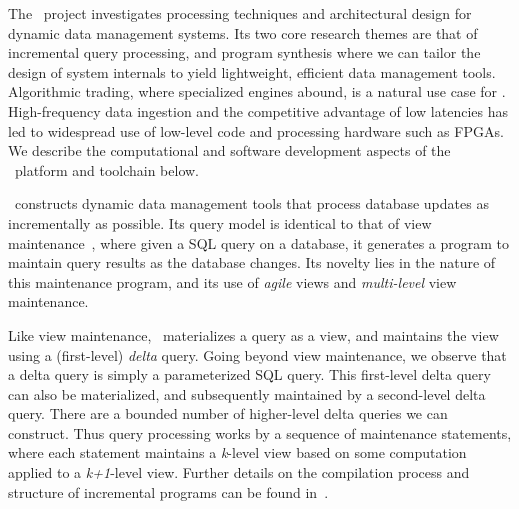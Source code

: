 \label{sec:dbtoaster}

The \compiler\ project investigates processing techniques and architectural
design for dynamic data management systems. Its two core research themes are
that of incremental query processing, and program synthesis where we can tailor
the design of system internals to yield lightweight, efficient data management
tools. Algorithmic trading, where specialized engines abound, is a natural use
case for \compiler. High-frequency data ingestion and the competitive advantage
of low latencies has led to widespread use of low-level code and processing
hardware such as FPGAs. We describe the computational and software development
aspects of the \compiler\ platform and toolchain below.

\compiler\ constructs dynamic data management tools that process database
updates as incrementally as possible. Its query model is identical to that of
view maintenance~\cite{griffin-sigmod:95}, where given a SQL query on a
database, it generates a program to maintain query results as the database
changes. Its novelty lies in the nature of this maintenance program, and its use
of \textit{agile} views and \textit{multi-level} view maintenance.

Like view maintenance, \compiler\ materializes a query as a view, and maintains
the view using a (first-level) \textit{delta} query. Going beyond view
maintenance, we observe that a delta query is simply a parameterized SQL query.
This first-level delta query can also be materialized, and subsequently
maintained by a second-level delta query. There are a bounded number
of higher-level delta queries we can construct. Thus query processing works by a
sequence of maintenance statements, where each statement maintains a
\textit{k}-level view based on some computation applied to a
\textit{k+1}-level view. Further details on the compilation process and
structure of incremental programs can be found in~\cite{KAK2011,koch-pods:10}.

